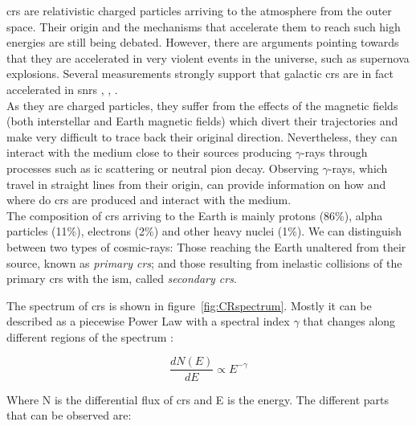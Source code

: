 \documentclass[main.tex]{subfiles}
\begin{document}
\glspl{cr} are relativistic charged particles arriving to the atmosphere from the outer space. Their origin and the mechanisms that accelerate them to reach such high energies are still being debated. However, there are arguments pointing towards that they are accelerated in very violent events in the universe, such as supernova explosions. Several measurements strongly support that galactic \glspl{cr} are in fact accelerated in \glspl{snr} \cite{2014CRinSNR}, \cite{2013CRinSNR}, \cite{2012CRinSNR}. \\

As they are charged particles, they suffer from the effects of the magnetic fields (both interstellar and Earth magnetic fields) which divert their trajectories and make very difficult to trace back their original direction. Nevertheless, they can interact with the medium close to their sources producing $\gamma$-rays through processes such as \gls{ic} scattering or neutral pion decay. Observing $\gamma$-rays, which travel in straight lines from their origin, can provide information on how and where do \glspl{cr} are produced and interact with the medium.\\

The composition of \glspl{cr} arriving to the Earth is mainly protons (86\%), alpha particles (11\%), electrons (2\%) and other heavy nuclei (1\%). We can distinguish between two types of cosmic-rays: Those reaching the Earth unaltered from their source, known as \textit{primary \glspl{cr}}; and those resulting from inelastic collisions of the primary \glspl{cr} with the \gls{ism}, called \textit{secondary \glspl{cr}}.

The spectrum of \glspl{cr} is shown in figure~\ref{fig:CRspectrum}. Mostly it can be described as a piecewise Power Law with a spectral index $\gamma$ that changes along different regions of the spectrum \cite{2016CRSpectrum}:

\begin{equation}
    \frac{dN(E)}{dE} \propto E^{-\gamma}
\end{equation}

Where N is the differential flux of \glspl{cr} and E is the energy. The different parts that can be observed are:
\end{document}

